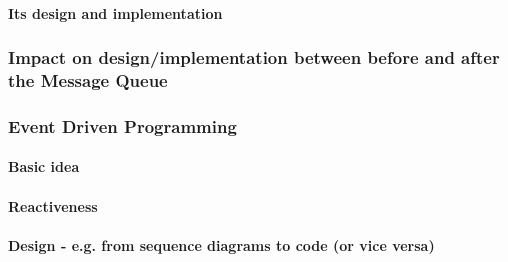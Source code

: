 \paragraph{Its design and implementation}

\subsubsection{Impact on design/implementation between before and after the Message Queue}

\subsubsection{Event Driven Programming}

\paragraph{Basic idea}

\paragraph{Reactiveness}

\paragraph{Design - e.g. from sequence diagrams to code (or vice versa)}
